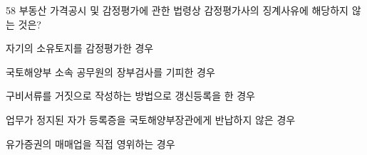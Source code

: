 \begin{question}{58}
부동산 가격공시 및 감정평가에 관한 법령상 감정평가사의 징계사유에 해당하지 않는 것은?
\begin{choices}
  \item 자기의 소유토지를 감정평가한 경우
  \item 국토해양부 소속 공무원의 장부검사를 기피한 경우
  \item 구비서류를 거짓으로 작성하는 방법으로 갱신등록을 한 경우
  \item 업무가 정지된 자가 등록증을 국토해양부장관에게 반납하지 않은 경우
  \item 유가증권의 매매업을 직접 영위하는 경우
\end{choices}
\end{question}
